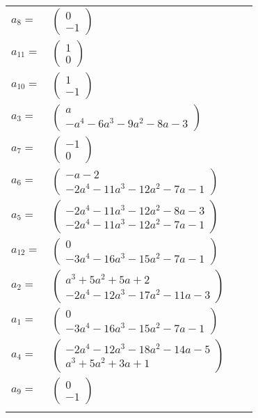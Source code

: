 \documentclass[1p]{elsarticle_modified}
\theoremstyle{definition}
\begin{document}
\begin{tabular}{m{7pt} m{180pt} m{7pt} m{180pt} }
\flushright $a_{8}=$&$\begin{pmatrix}0\\-1\end{pmatrix}$ \\
\flushright $a_{11}=$&$\begin{pmatrix}1\\0\end{pmatrix}$ \\
\flushright $a_{10}=$&$\begin{pmatrix}1\\-1\end{pmatrix}$ \\
\flushright $a_{3}=$&$\begin{pmatrix}a\\- a^4-6 a^3-9 a^2-8 a-3\end{pmatrix}$ \\
\flushright $a_{7}=$&$\begin{pmatrix}-1\\0\end{pmatrix}$ \\
\flushright $a_{6}=$&$\begin{pmatrix}- a-2\\-2 a^4-11 a^3-12 a^2-7 a-1\end{pmatrix}$ \\
\flushright $a_{5}=$&$\begin{pmatrix}-2 a^4-11 a^3-12 a^2-8 a-3\\-2 a^4-11 a^3-12 a^2-7 a-1\end{pmatrix}$ \\
\flushright $a_{12}=$&$\begin{pmatrix}0\\-3 a^4-16 a^3-15 a^2-7 a-1\end{pmatrix}$ \\
\flushright $a_{2}=$&$\begin{pmatrix}a^3+5 a^2+5 a+2\\-2 a^4-12 a^3-17 a^2-11 a-3\end{pmatrix}$ \\
\flushright $a_{1}=$&$\begin{pmatrix}0\\-3 a^4-16 a^3-15 a^2-7 a-1\end{pmatrix}$ \\
\flushright $a_{4}=$&$\begin{pmatrix}-2 a^4-12 a^3-18 a^2-14 a-5\\a^3+5 a^2+3 a+1\end{pmatrix}$ \\
\flushright $a_{9}=$&$\begin{pmatrix}0\\-1\end{pmatrix}$\\&\end{tabular}
\end{document}
